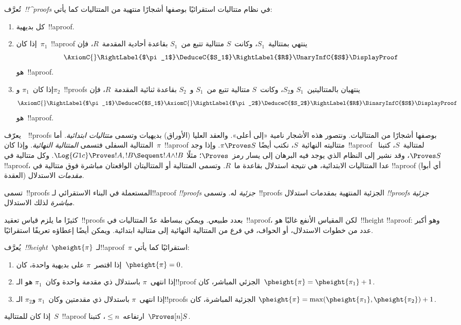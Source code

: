 \documentclass[../../../include/open-logic-section]{subfiles}
\begin{document}
\begin{defn}
تُعرَّف~\emph{!!^{proof}s} في نظام متتاليات استقرائيًا بوصفها أشجارًا
منتهية من المتتاليات كما يأتي:
\begin{enumerate}
  \item{} كل بديهية~!!a{proof}.
  \item{} إذا كان~$\pi_1$~!!a{proof} ينتهي
  بمتتالية~$S_1$، وكانت~$S$ متتالية تتبع من~$S_1$ بقاعدة أحادية
  المقدمة~$R$، فإن
  \[
  \AxiomC{}
  \RightLabel{$\pi_1$}
  \DeduceC{$S_1$}
  \RightLabel{$R$}
  \UnaryInfC{$S$}
  \DisplayProof
  \]
  هو~!!a{proof}.
  \item{} إذا كان~$\pi_1$ و$\pi_2$~!!{proof}s
  ينتهيان بالمتتاليتين~$S_1$ و$S_2$، وكانت~$S$ متتالية تتبع من~$S_1$
  و~$S_2$ بقاعدة ثنائية المقدمة~$R$، فإن
  \[
  \AxiomC{}
  \RightLabel{$\pi_1$}
  \DeduceC{$S_1$}
  \AxiomC{}
  \RightLabel{$\pi_2$}
  \DeduceC{$S_2$}
  \RightLabel{$R$}
  \BinaryInfC{$S$}
  \DisplayProof
  \]
  هو~!!a{proof}.
\end{enumerate}
\end{defn}

يعرّف~~!!{proof}s بوصفها أشجارًا من المتتاليات. ونتصور
هذه الأشجار نامية «إلى أعلى». والعقد العليا (الأوراق) بديهيات وتسمى
\emph{متتاليات ابتدائية}. أما المتتالية السفلى فتسمى \emph{المتتالية
النهائية}. وإذا كان~$\pi$~!!a{proof} متتاليته النهائية~$S$، نكتب أيضًا
$\pi\Proves S$. وإذا وجد~!!a{proof} لمتتالية~$S$، كتبنا~$\Proves S$،
وقد نشير إلى النظام الذي يوجد فيه البرهان إلى يسار رمز~$\Proves$؛ مثلًا
$\Log{G1c}\Proves !A,!B\Sequent !A\land !B$. وكل متتالية في
!!a{proof}، عدا المتتاليات الابتدائية، هي \emph{نتيجة} استدلال بقاعدة
ما~$R$. وتسمى المتتالية أو المتتاليتان الواقعتان مباشرة فوق متتالية في
!!a{proof} (أي أبوا العقدة) \emph{مقدمات} الاستدلال.

تسمى~!!{proof}s المستعملة في البناء الاستقرائي لـ!!a{proof}
\emph{!!{proof}s جزئية} له. وتسمى~!!{proof}s الجزئية المنتهية بمقدمات
استدلال \emph{!!{proof}s جزئية مباشرة} لذلك الاستدلال.

كثيرًا ما يلزم قياس تعقيد~!!{proof}s بعدد طبيعي. ويمكن ببساطة عدّ
المتتاليات في~!!a{proof}، لكن المقياس الأنفع غالبًا هو~!!{height}
!!a{proof}: وهو أكبر عدد من خطوات الاستدلال، أو الحواف، في فرع من
المتتالية النهائية إلى متتالية ابتدائية. ويمكن أيضًا إعطاؤه تعريفًا
استقرائيًا.

\begin{defn}
يُعرَّف~\emph{!!{height}}~$\pheight{\pi}$ لـ!!a{proof}~$\pi$ استقرائيًا
كما يأتي:
\begin{enumerate}
  \item إذا اقتصر~$\pi$ على بديهية واحدة، كان~$\pheight{\pi}=0$.
  \item إذا انتهى~$\pi$ باستدلال ذي مقدمة واحدة وكان~$\pi_1$ هو
  الـ!!{proof} الجزئي المباشر، كان~$\pheight{\pi}=\pheight{\pi_1}+1$.
  \item إذا انتهى~$\pi$ باستدلال ذي مقدمتين وكان~$\pi_1$ و$\pi_2$
  الـ!!{proof}s الجزئية المباشرة، كان
  $\pheight{\pi}=\max(\pheight{\pi_1},\pheight{\pi_2})+1$.
\end{enumerate}
إذا كان للمتتالية~$S$~!!a{proof} ارتفاعه~$\le n$، كتبنا~$\Proves[n]S$.
\end{defn}
\end{document}
